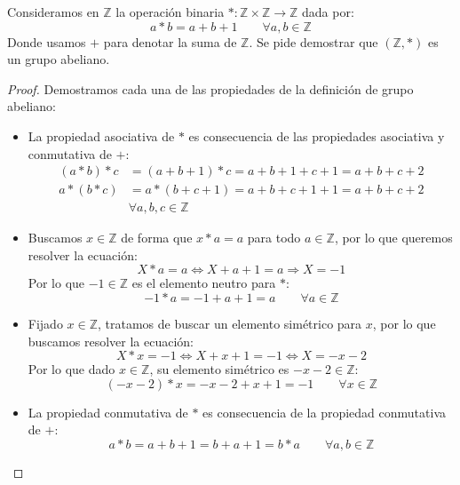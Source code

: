 \begin{ejemplo}
    Consideramos en $\mathbb{Z}$ la operación binaria $\ast:\mathbb{Z}\times\mathbb{Z} \rightarrow \mathbb{Z}$ dada por:
    \begin{equation*}
        a\ast b = a + b + 1 \qquad \forall a,b\in \mathbb{Z}
    \end{equation*}
    Donde usamos $+$ para denotar la suma de $\mathbb{Z}$. Se pide demostrar que $(\mathbb{Z},\ast)$ es un grupo abeliano.
    \begin{proof}
        Demostramos cada una de las propiedades de la definición de grupo abeliano:
        \begin{itemize}
            \item La propiedad asociativa de $\ast$ es consecuencia de las propiedades asociativa y conmutativa de $+$:
            \begin{align*}
                (a\ast b) \ast c &= (a+b+1) \ast c = a + b + 1 + c + 1 = a + b + c + 2 \\
                a \ast (b\ast c) &= a\ast (b+c+1) = a+b+c+1+1 = a + b + c + 2 \\
                                 &\forall a,b,c\in \mathbb{Z}
            \end{align*}
            \item Buscamos $x\in \mathbb{Z}$ de forma que $x\ast a = a$ para todo $a\in \mathbb{Z}$, por lo que queremos resolver la ecuación:
                \begin{equation*}
                    X\ast a = a \Longleftrightarrow  X + a + 1 = a \Longrightarrow X = -1
                \end{equation*}
                Por lo que $-1\in \mathbb{Z}$ es el elemento neutro para $\ast$:
                \begin{equation*}
                    -1\ast a = -1 + a +1 = a \qquad \forall a\in \mathbb{Z}
                \end{equation*}
            \item Fijado $x\in \mathbb{Z}$, tratamos de buscar un elemento simétrico para $x$, por lo que buscamos resolver la ecuación:
                \begin{equation*}
                    X\ast x = -1 \Longleftrightarrow X + x + 1 = -1 \Longleftrightarrow X = -x-2
                \end{equation*}
                Por lo que dado $x\in \mathbb{Z}$, su elemento simétrico es $-x-2\in \mathbb{Z}$:
                \begin{equation*}
                    (-x-2)\ast x = -x-2+x+1 = -1 \qquad \forall x\in \mathbb{Z}
                \end{equation*}
            \item La propiedad conmutativa de $\ast$ es consecuencia de la propiedad conmutativa de $+$:
                \begin{equation*}
                    a\ast b = a + b + 1 = b + a + 1 = b \ast a \qquad \forall a,b\in \mathbb{Z}
                \end{equation*}
        \end{itemize}
    \end{proof}
\end{ejemplo}
